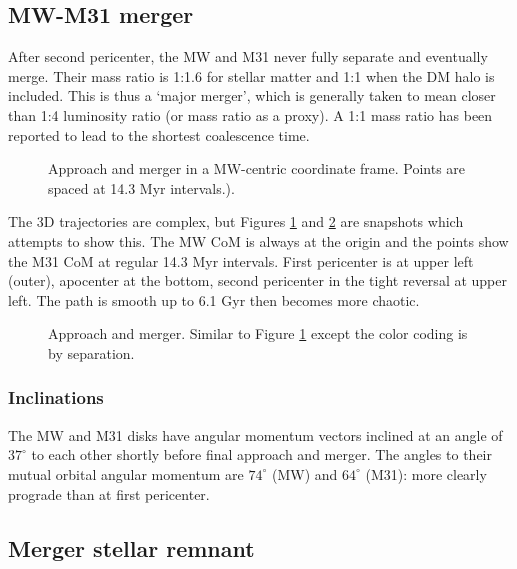 \documentclass[twocolumn]{aastex63}
\newcommand{\todo}{\color{red}{TODO}\color{black}\hspace{2mm}}
\begin{document}
\subsection{MW-M31 merger}

After second pericenter, the MW and M31 never fully separate and eventually merge. Their mass ratio is 1:1.6 for stellar matter and 1:1 when the DM halo is included. This is thus a `major merger', which is generally taken to mean closer than 1:4 luminosity ratio (or mass ratio as a proxy). A 1:1 mass ratio has been reported \citep{boylan-kolchin_dynamical_2008, ji_lifetime_2014} to lead to the shortest coalescence time.

\begin{figure}[htb!]
	\caption{Approach and merger in a MW-centric coordinate frame. Points are spaced at 14.3 Myr intervals.).
		\label{fig:MW_M31_traj_time}}
\end{figure}

The 3D trajectories are complex, but Figures \ref{fig:MW_M31_traj_time} and \ref{fig:MW_M31_traj_sep} are snapshots which attempts to show this. The MW CoM is always at the origin and the points show the M31 CoM at regular 14.3 Myr intervals. First pericenter is at upper left (outer), apocenter at the bottom, second pericenter in the tight reversal at upper left. The path is smooth up to 6.1 Gyr then becomes more chaotic.

\begin{figure}[htb!]
	\caption{Approach and merger. Similar to Figure \ref{fig:MW_M31_traj_time} except the color coding is by separation.
		\label{fig:MW_M31_traj_sep}}
\end{figure}


\subsubsection{Inclinations}

The MW and M31 disks have angular momentum vectors inclined at an angle of $37^\circ$ to each other shortly before final approach and merger. The angles to their mutual orbital angular momentum are $74^\circ$ (MW) and $64^\circ$ (M31): more clearly prograde than at first pericenter.

\todo{discuss implications}

\subsection{Merger stellar remnant}
\end{document}
